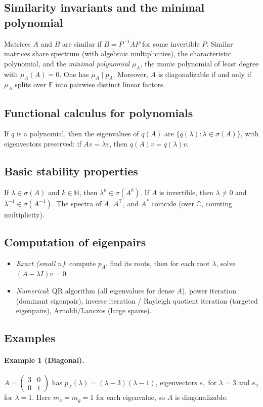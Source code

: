 \documentclass[12pt,a4paper]{article}
\theoremstyle{plain}
\theoremstyle{definition}
\theoremstyle{remark}
\theoremstyle{remark}
\begin{document}
	\subsection*{Similarity invariants and the minimal polynomial}
	Matrices $A$ and $B$ are similar if $B=P^{-1}AP$ for some invertible $P$. Similar matrices share spectrum (with algebraic multiplicities), the characteristic polynomial, and the \emph{minimal polynomial} $\mu_A$, the monic polynomial of least degree with $\mu_A(A)=0$. One has $\mu_A\mid p_A$. Moreover, $A$ is diagonalizable if and only if $\mu_A$ splits over $\mathbb{F}$ into pairwise distinct linear factors.
	
	\subsection*{Functional calculus for polynomials}
	If $q$ is a polynomial, then the eigenvalues of $q(A)$ are $\{q(\lambda):\lambda\in\sigma(A)\}$, with eigenvectors preserved: if $A v=\lambda v$, then $q(A)v=q(\lambda)v$.
	
	\subsection*{Basic stability properties}
	If $\lambda\in\sigma(A)$ and $k\in\mathbb{N}$, then $\lambda^k\in\sigma(A^k)$. If $A$ is invertible, then $\lambda\ne 0$ and $\lambda^{-1}\in\sigma(A^{-1})$. The spectra of $A$, $A^\top$, and $A^*$ coincide (over $\mathbb{C}$, counting multiplicity).
	
	\subsection*{Computation of eigenpairs}
	\begin{itemize}
		\item \emph{Exact (small $n$)}: compute $p_A$, find its roots, then for each root $\lambda$, solve $(A-\lambda I)v=0$.
		\item \emph{Numerical}: QR algorithm (all eigenvalues for dense $A$), power iteration (dominant eigenpair), inverse iteration / Rayleigh quotient iteration (targeted eigenpairs), Arnoldi/Lanczos (large sparse).
	\end{itemize}
	
	\subsection*{Examples}
	\paragraph{Example 1 (Diagonal).}
	$A=\begin{pmatrix}3&0\\0&1\end{pmatrix}$ has $p_A(\lambda)=(\lambda-3)(\lambda-1)$, eigenvectors $e_1$ for $\lambda=3$ and $e_2$ for $\lambda=1$. Here $m_a=m_g=1$ for each eigenvalue, so $A$ is diagonalizable.
	
\end{document}
